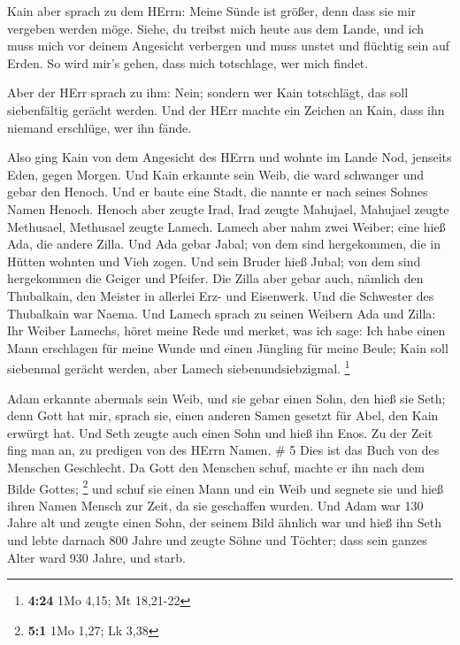  Kain aber sprach zu dem HErrn: Meine Sünde ist größer,
denn dass sie mir vergeben werden möge.  Siehe, du treibst
mich heute aus dem Lande, und ich muss mich vor deinem Angesicht
verbergen und muss unstet und flüchtig sein auf Erden. So wird mir's
gehen, dass mich totschlage, wer mich findet.

 Aber der HErr sprach zu ihm: Nein; sondern wer Kain
totschlägt, das soll siebenfältig gerächt werden. Und der HErr machte
ein Zeichen an Kain, dass ihn niemand erschlüge, wer ihn fände.

 Also ging Kain von dem Angesicht des HErrn und wohnte im
Lande Nod, jenseits Eden, gegen Morgen.  Und Kain erkannte
sein Weib, die ward schwanger und gebar den Henoch. Und er baute eine
Stadt, die nannte er nach seines Sohnes Namen Henoch. 
Henoch aber zeugte Irad, Irad zeugte Mahujael, Mahujael zeugte
Methusael, Methusael zeugte Lamech.  Lamech aber nahm zwei
Weiber; eine hieß Ada, die andere Zilla.  Und Ada gebar
Jabal; von dem sind hergekommen, die in Hütten wohnten und Vieh zogen.
 Und sein Bruder hieß Jubal; von dem sind hergekommen die
Geiger und Pfeifer.  Die Zilla aber gebar auch, nämlich den
Thubalkain, den Meister in allerlei Erz- und Eisenwerk. Und die
Schwester des Thubalkain war Naema.  Und Lamech sprach zu
seinen Weibern Ada und Zilla: Ihr Weiber Lamechs, höret meine Rede und
merket, was ich sage: Ich habe einen Mann erschlagen für meine Wunde und
einen Jüngling für meine Beule;  Kain soll siebenmal
gerächt werden, aber Lamech siebenundsiebzigmal. \footnote{\textbf{4:24}
  1Mo 4,15; Mt 18,21-22}

 Adam erkannte abermals sein Weib, und sie gebar einen
Sohn, den hieß sie Seth; denn Gott hat mir, sprach sie, einen anderen
Samen gesetzt für Abel, den Kain erwürgt hat.  Und Seth
zeugte auch einen Sohn und hieß ihn Enos. Zu der Zeit fing man an, zu
predigen von des HErrn Namen. \# 5  Dies ist das Buch von
des Menschen Geschlecht. Da Gott den Menschen schuf, machte er ihn nach
dem Bilde Gottes; \footnote{\textbf{5:1} 1Mo 1,27; Lk 3,38} 
und schuf sie einen Mann und ein Weib und segnete sie und hieß ihren
Namen Mensch zur Zeit, da sie geschaffen wurden.  Und Adam
war 130 Jahre alt und zeugte einen Sohn, der seinem Bild ähnlich war und
hieß ihn Seth  und lebte darnach 800 Jahre und zeugte Söhne
und Töchter;  dass sein ganzes Alter ward 930 Jahre, und
starb.

